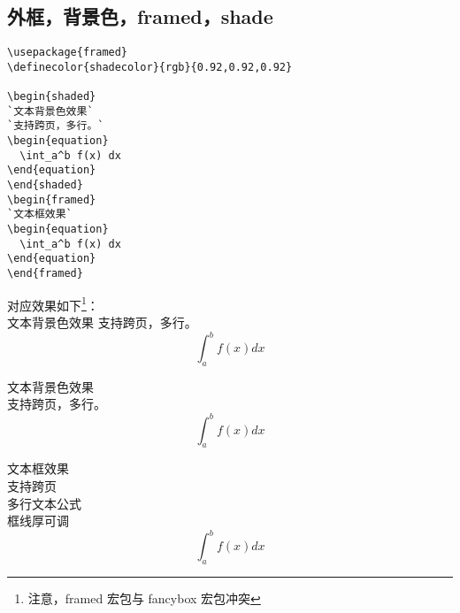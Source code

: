 \subsection{外框，背景色，framed，shade}

\begin{lstlisting}[language={[LaTeX]TeX}]
\usepackage{framed}
\definecolor{shadecolor}{rgb}{0.92,0.92,0.92}

\begin{shaded}
`文本背景色效果`
`支持跨页，多行。`
\begin{equation}
  \int_a^b f(x) dx
\end{equation}
\end{shaded}
\begin{framed}
`文本框效果`
\begin{equation}
  \int_a^b f(x) dx
\end{equation}
\end{framed}

\end{lstlisting}

对应效果如下\textcolor[rgb]{1.00,0.00,0.00}{\footnote{注意，framed 宏包与 fancybox 宏包冲突}}：\\
文本背景色效果
支持跨页，多行。
\begin{equation}
  \int_a^b f(x) dx
\end{equation}

\begin{shaded}
文本背景色效果\\
支持跨页，多行。
\begin{equation}
  \int_a^b f(x) dx
\end{equation}
\end{shaded}

\begin{framed}
文本框效果\\
支持跨页\\
多行文本公式\\
框线厚可调\\
\begin{equation}
  \int_a^b f(x) dx
\end{equation}
\end{framed}

